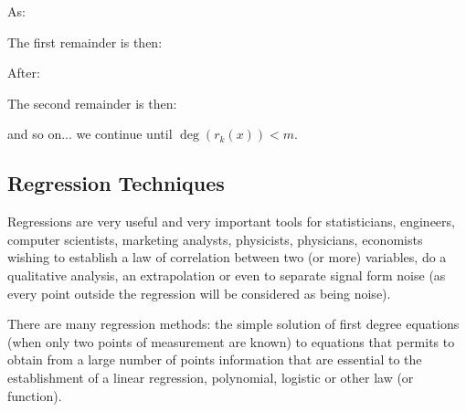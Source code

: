	As:
	
	The first remainder is then:
	
	After:
	
	The second remainder is then:
	
	and so on... we continue until $\deg(r_k(x))<m$.	
	
	\pagebreak
	\subsection{Regression Techniques}\label{regression techniques}
	Regressions are very useful and very important tools for statisticians, engineers, computer scientists, marketing analysts, physicists, physicians, economists wishing to establish a law of correlation between two (or more) variables, do a qualitative analysis, an extrapolation or even to separate signal form noise (as every point outside the regression will be considered as being noise).
	
	There are many regression  methods: the simple solution of first degree equations (when only two points of measurement are known) to equations that permits to obtain from a large number of points information that are essential to the establishment of a linear regression, polynomial, logistic or other law (or function).
	
